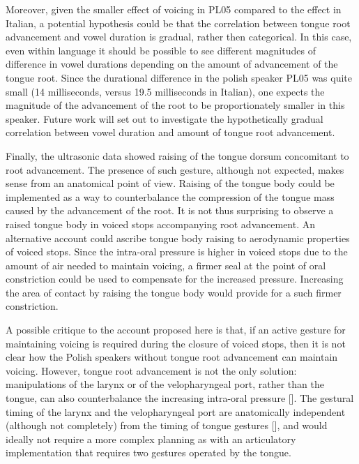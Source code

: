 \documentclass[authoryear, twocolumn]{elsarticle}
\begin{document}
Moreover, given the smaller effect of voicing in PL05 compared to the
effect in Italian, a potential hypothesis could be that the correlation
between tongue root advancement and vowel duration is gradual, rather
then categorical. In this case, even within language it should be
possible to see different magnitudes of difference in vowel durations
depending on the amount of advancement of the tongue root. Since the
durational difference in the polish speaker PL05 was quite small (14
milliseconds, versus 19.5 milliseconds in Italian), one expects the
magnitude of the advancement of the root to be proportionately smaller
in this speaker. Future work will set out to investigate the
hypothetically gradual correlation between vowel duration and amount of
tongue root advancement.

Finally, the ultrasonic data showed raising of the tongue dorsum
concomitant to root advancement. The presence of such gesture, although
not expected, makes sense from an anatomical point of view. Raising of
the tongue body could be implemented as a way to counterbalance the
compression of the tongue mass caused by the advancement of the root. It
is not thus surprising to observe a raised tongue body in voiced stops
accompanying root advancement. An alternative account could ascribe
tongue body raising to aerodynamic properties of voiced stops. Since the
intra-oral pressure is higher in voiced stops due to the amount of air
needed to maintain voicing, a firmer seal at the point of oral
constriction could be used to compensate for the increased pressure.
Increasing the area of contact by raising the tongue body would provide
for a such firmer constriction.

A possible critique to the account proposed here is that, if an active
gesture for maintaining voicing is required during the closure of voiced
stops, then it is not clear how the Polish speakers without tongue root
advancement can maintain voicing. However, tongue root advancement is
not the only solution: manipulations of the larynx or of the
velopharyngeal port, rather than the tongue, can also counterbalance the
increasing intra-oral pressure {[}{]}. The gestural timing of the larynx
and the velopharyngeal port are anatomically independent (although not
completely) from the timing of tongue gestures {[}{]}, and would ideally
not require a more complex planning as with an articulatory
implementation that requires two gestures operated by the tongue.


\end{document}
